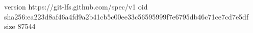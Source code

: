 version https://git-lfs.github.com/spec/v1
oid sha256:ea223d8af46a4fd9a2b41cb5c00ee33c56595999f7e6795db46c71ce7cd7e5df
size 87544
